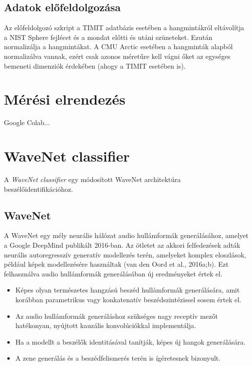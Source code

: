 \subsection{Adatok előfeldolgozása}

Az előfeldolgozó szkript a TIMIT adatbázis esetében a hangmintákról eltávolítja a NIST Sphere fejlécet és a mondat előtti és utáni szüneteket. Ezután normalizálja a hangmintákat. A CMU Arctic esetében a hangminták alapból normalizálva vannak, ezért csak azonos méretűre kell vágni őket az egységes bemeneti dimenziók érdekében (ahogy a TIMIT esetében is).

\section{Mérési elrendezés}

Google Colab...

\section{WaveNet classifier}

A \emph{WaveNet classifier} egy módosított WaveNet architektúra beszélőidentifikációhoz.

\subsection{WaveNet}

A WaveNet egy mély neurális hálózat audio hullámformák generálásához, amelyet a Google DeepMind publikált 2016-ban. Az ötletet az akkori felfedezések adták neurális autoregresszív generatív modellezés terén, amelyeket komplex eloszlások, például képek modellezésére használtak (van den Oord et al., 2016a;b). Ezt felhasználva audio hullámformák generálásában új eredményeket értek el.

\begin{itemize}
	\item Képes olyan természetes hangzású beszéd hullámformák generálására, amit korábban parametrikus vagy konkatenatív beszédszintézissel sosem értek el. 
	\item Az audio hullámformák generáláshoz szükséges nagy receptív mezőt hatékonyan, nyújtott kauzális konvolúciókkal implementálja.
	\item Ha a modellt a beszélők identitásával tanítják, képes új hangok generálására.
	\item A zene generálás és a beszédfelismerés terén is ígéretesnek bizonyult.
\end{itemize}

